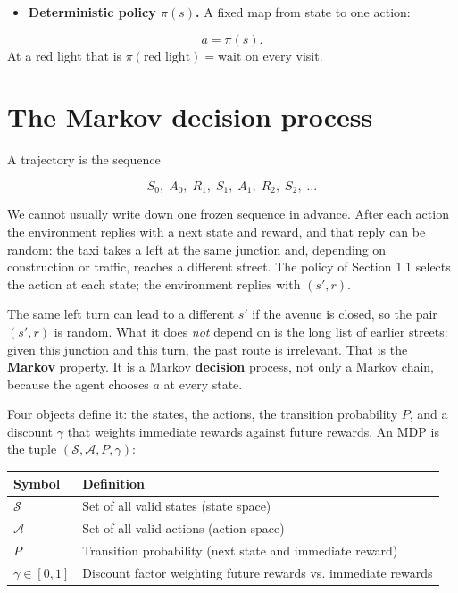 \begin{itemize}
\item \textbf{Deterministic policy $\pi(s)$.} A fixed map from state to one action:
\end{itemize}
\[
a = \pi(s).
\] At a red light that is $\pi(\text{red light})=\text{wait}$ on every visit.

\section{The Markov decision process}
A trajectory is the sequence

\[
S_0,\; A_0,\; R_1,\; S_1,\; A_1,\; R_2,\; S_2,\; \ldots
\]

We cannot usually write down one frozen sequence in advance. After each action the environment replies with a next state and reward, and that reply can be random: the taxi takes a left at the same junction and, depending on construction or traffic, reaches a different street. The policy of Section 1.1 selects the action at each state; the environment replies with $(s',r)$.

The same left turn can lead to a different $s'$ if the avenue is closed, so the pair $(s', r)$ is random. What it does \textit{not} depend on is the long list of earlier streets: given this junction and this turn, the past route is irrelevant. That is the \textbf{Markov} property. It is a Markov \textbf{decision} process, not only a Markov chain, because the agent chooses $a$ at every state.

Four objects define it: the states, the actions, the transition probability $P$, and a discount $\gamma$ that weights immediate rewards against future rewards. An MDP is the tuple $(\mathcal{S}, \mathcal{A}, P, \gamma)$:

\begin{center}
\begin{tabular}{ll}
\toprule
Symbol & Definition \\
\midrule
$\mathcal{S}$ & Set of all valid states (state space) \\
$\mathcal{A}$ & Set of all valid actions (action space) \\
$P$ & Transition probability (next state and immediate reward) \\
$\gamma \in [0, 1]$ & Discount factor weighting future rewards vs. immediate rewards \\
\bottomrule
\end{tabular}
\end{center}

